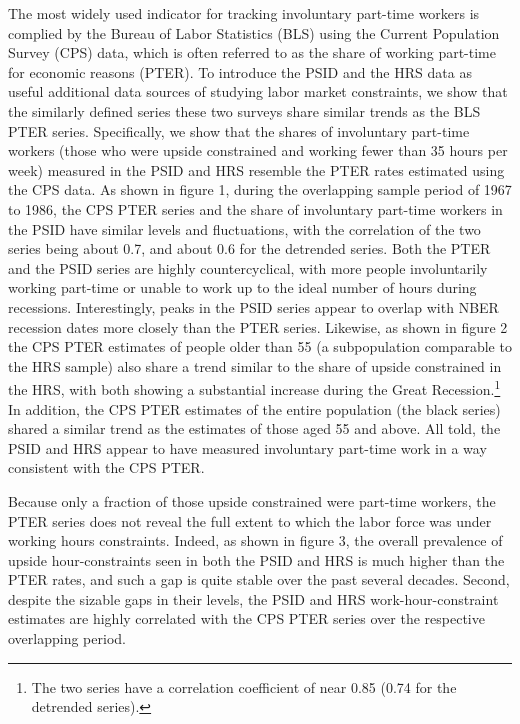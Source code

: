 The most widely used indicator for tracking involuntary part-time workers is complied by the Bureau of Labor Statistics (BLS) using the Current Population Survey (CPS) data, which is often referred to as the share of working part-time for economic reasons (PTER). To introduce the PSID and the HRS data as useful additional data sources of studying labor market constraints, we show that the similarly defined series these two surveys share similar trends as the BLS PTER series.   Specifically, we show that the shares of involuntary part-time workers (those who were upside constrained and working fewer than 35 hours per week) measured in the PSID and HRS resemble the PTER rates estimated using the CPS data.  As shown in figure 1, during the overlapping sample period of 1967 to 1986, the CPS PTER series and the share of involuntary part-time workers in the PSID have similar levels and fluctuations, with the correlation of the two series being about 0.7, and about 0.6 for the detrended series. Both the PTER and the PSID series are highly countercyclical, with more people involuntarily working part-time or unable to work up to the ideal number of hours during recessions. Interestingly, peaks in the PSID series appear to overlap with NBER recession dates more closely than the PTER series.  Likewise, as shown in figure 2 the CPS PTER estimates of people older than 55 (a subpopulation comparable to the HRS sample) also share a trend similar to the share of upside constrained in the HRS, with both showing a substantial increase during the Great Recession.\footnote{The two series have a correlation coefficient of near 0.85 (0.74 for the detrended series).}  In addition, the CPS PTER estimates of the entire population (the black series) shared a similar trend as the estimates of those aged 55 and above.   All told, the PSID and HRS appear to have measured involuntary part-time work in a way consistent with the CPS PTER.

Because only a fraction of those upside constrained were part-time workers, the PTER series does not reveal the full extent to which the labor force was under working hours constraints. Indeed, as shown in figure 3, the overall prevalence of upside hour-constraints seen in both the PSID and HRS is much higher than the PTER rates, and such a gap is quite stable over the past several decades.  Second, despite the sizable gaps in their levels, the PSID and HRS work-hour-constraint estimates are highly correlated with the CPS PTER series over the respective overlapping period.

